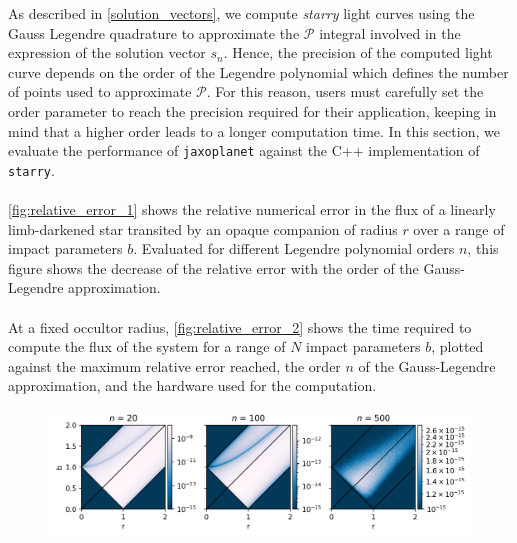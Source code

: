 \documentclass[modern]{aastex631}
\begin{document}
As described in \autoref{solution_vectors}, we compute \textit{starry} light curves using the Gauss Legendre quadrature to approximate the $\mathcal{P}$ integral involved in the expression of the solution vector $s_{n}$. Hence, the precision of the computed light curve depends on the order of the Legendre polynomial which defines the number of points used to approximate $\mathcal{P}$. For this reason, users must carefully set the order parameter to reach the precision required for their application, keeping in mind that a higher order leads to a longer computation time. In this section, we evaluate the performance of \texttt{jaxoplanet} against the C++ implementation of \texttt{starry}.\\\\
\autoref{fig:relative_error_1} shows the relative numerical error in the flux of a linearly limb-darkened star transited by an opaque companion of radius $r$ over a range of impact parameters $b$. Evaluated for different Legendre polynomial orders $n$, this figure shows the decrease of the relative error with the order of the Gauss-Legendre approximation.\\\\
At a fixed occultor radius, \autoref{fig:relative_error_2} shows the time required to compute the flux of the system for a range of $N$ impact parameters $b$, plotted against the maximum relative error reached, the order $n$ of the Gauss-Legendre approximation, and the hardware used for the computation.
\begin{figure}[H]
    \begin{center}
        \includegraphics[width=\textwidth]{../workflows/performance/figures/error_n.png}
        \caption{}
        \label{fig:relative_error_1}
    \end{center}
\end{figure}
\end{document}

